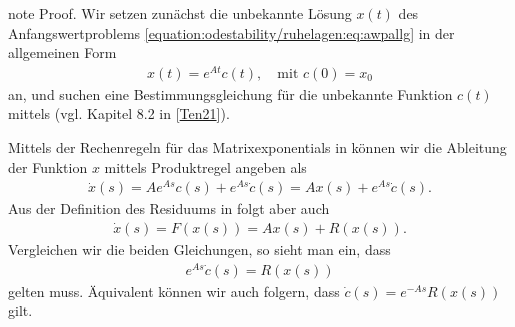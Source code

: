 \documentclass[letterpaper,10pt,english]{jupyterBook}
\begin{document}
\begin{sphinxadmonition}{note}
\sphinxAtStartPar
Proof. Wir setzen zunächst die unbekannte Lösung \(x(t)\) des Anfangswertproblems \eqref{equation:odestability/ruhelagen:eq:awpallg} in der allgemeinen Form
\begin{equation*}
\begin{split}x(t) = e^{At}c(t),\quad \text{mit }c(0) = x_0\end{split}
\end{equation*}
\sphinxAtStartPar
an, und suchen eine Bestimmungsgleichung für die unbekannte Funktion \(c(t)\) mittels  (vgl. Kapitel 8.2 in {[}\hyperlink{cite.references:id12}{Ten21}{]}).

\sphinxAtStartPar
Mittels der Rechenregeln für das Matrixexponentials in {\hyperref[\detokenize{ode/repetition:rem:matrixexponentialregeln}]{}} können wir die Ableitung der Funktion \(x\) mittels Produktregel angeben als
\begin{equation*}
\begin{split}\dot{x}(s) = A e^{As}c(s)+ e^{As}\dot{c}(s) = Ax(s) + e^{As}\dot{c}(s).\end{split}
\end{equation*}
\sphinxAtStartPar
Aus der Definition des Residuums in {\hyperref[\detokenize{odestability/ruhelagen:def:linearisierung}]{}} folgt aber auch
\begin{equation*}
\begin{split}\dot{x}(s) = F(x(s)) = Ax(s) + R(x(s)).\end{split}
\end{equation*}
\sphinxAtStartPar
Vergleichen wir die beiden Gleichungen, so sieht man ein, dass
\begin{equation*}
\begin{split}e^{As}\dot{c}(s) = R(x(s))\end{split}
\end{equation*}
\sphinxAtStartPar
gelten muss.
Äquivalent können wir auch folgern, dass \(\dot{c}(s) = e^{-As}R(x(s))\) gilt.


\end{sphinxadmonition}
\end{document}
